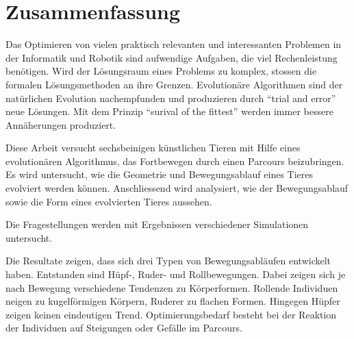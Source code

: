 %
%


\chapter{Zusammenfassung}

  Das Optimieren von vielen praktisch relevanten und interessanten Problemen in der Informatik und Robotik sind aufwendige Aufgaben,
  die viel Rechenleistung benötigen.
  Wird der Lösungsraum eines Problems zu komplex, stossen die formalen Lösungsmethoden an ihre Grenzen.
  Evolutionäre Algorithmen sind der natürlichen Evolution nachempfunden und
  produzieren durch ``trial and error'' neue Lösungen.
  Mit dem Prinzip ``surival of the fittest'' werden immer bessere Annäherungen produziert.

  \smallskip

  Diese Arbeit versucht sechsbeinigen künstlichen Tieren mit Hilfe eines evolutionären Algorithmus,
  das Fortbewegen durch einen Parcours beizubringen.
  Es wird untersucht, wie die Geometrie und Bewegungsablauf eines Tieres evolviert werden können.
  Anschliessend wird analysiert, wie der Bewegungsablauf sowie die Form eines evolvierten Tieres aussehen.



  Die Fragestellungen werden mit Ergebnissen verschiedener Simulationen untersucht. %

  \smallskip

  Die Resultate zeigen, dass sich drei Typen von Bewegungsabläufen entwickelt haben.
  Entstanden sind Hüpf-, Ruder- und Rollbewegungen.
  Dabei zeigen sich je nach Bewegung verschiedene Tendenzen zu Körperformen.
  Rollende Individuen neigen zu kugelförmigen Körpern, Ruderer zu flachen Formen.
  Hingegen Hüpfer zeigen keinen eindeutigen Trend.
  Optimierungsbedarf besteht bei der Reaktion der Individuen auf Steigungen oder Gefälle im Parcours.
